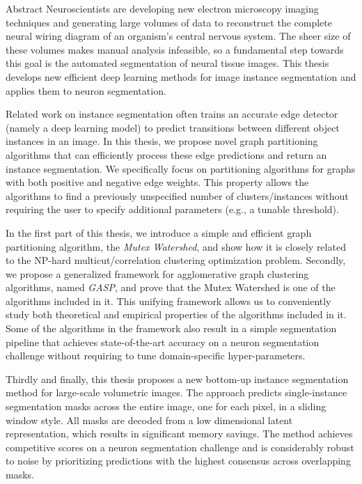 
\begin{coverpage}{Abstract}
Neuroscientists are developing new electron microscopy imaging techniques and generating large volumes of data to reconstruct the complete neural wiring diagram of an organism's central nervous system.
The sheer size of these volumes makes manual analysis infeasible, so a fundamental step towards this goal is the automated segmentation of neural tissue images. 
This thesis develops new efficient deep learning methods for image instance segmentation and applies them to neuron segmentation.

Related work on instance segmentation often trains an accurate edge detector (namely a deep learning model) to predict transitions between different object instances in an image. In this thesis, we propose novel graph partitioning algorithms that can efficiently process these edge predictions and return an instance segmentation. 
We specifically focus on partitioning algorithms for graphs with both positive and negative edge weights. This property allows the algorithms to find a previously unspecified number of clusters/instances without requiring the user to specify additional parameters (e.g., a tunable threshold).

In the first part of this thesis, we introduce a simple and efficient graph partitioning algorithm, the \emph{Mutex Watershed}, and show how it is closely related to the NP-hard multicut/correlation clustering optimization problem.
Secondly, we propose a generalized framework for agglomerative graph clustering algorithms, named \emph{GASP}, and prove that the Mutex Watershed is one of the algorithms included in it.
This unifying framework allows us to conveniently study both theoretical and empirical properties of the algorithms included in it. Some of the algorithms in the framework also result in a simple segmentation pipeline that achieves state-of-the-art accuracy on a neuron segmentation challenge without requiring to tune domain-specific hyper-parameters. 

Thirdly and finally, this thesis proposes a new bottom-up instance segmentation method for large-scale volumetric images. The approach predicts single-instance segmentation masks across the entire image, one for each pixel, in a sliding window style. All masks are decoded from a low dimensional latent representation, which results in significant memory savings. The method achieves competitive scores on a neuron segmentation challenge and is considerably robust to noise by prioritizing predictions with the highest consensus across overlapping masks.

\end{coverpage}

